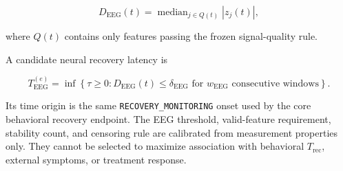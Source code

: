 \[
D_{\mathrm{EEG}}(t)
=
\operatorname{median}_{j\in Q(t)}
\left|z_j(t)\right|,
\]

where \(Q(t)\) contains only features passing the frozen signal-quality rule.

A candidate neural recovery latency is

\[
T_{\mathrm{EEG}}^{(e)}
=
\inf
\left\{
\tau \ge 0:
D_{\mathrm{EEG}}(t)\le\delta_{\mathrm{EEG}}
\text{ for }
w_{\mathrm{EEG}}
\text{ consecutive windows}
\right\}.
\]

Its time origin is the same \texttt{RECOVERY\_MONITORING} onset used by the core behavioral recovery endpoint. The EEG threshold, valid-feature requirement, stability count, and censoring rule are calibrated from measurement properties only. They cannot be selected to maximize association with behavioral \(T_{\mathrm{rec}}\), external symptoms, or treatment response.
